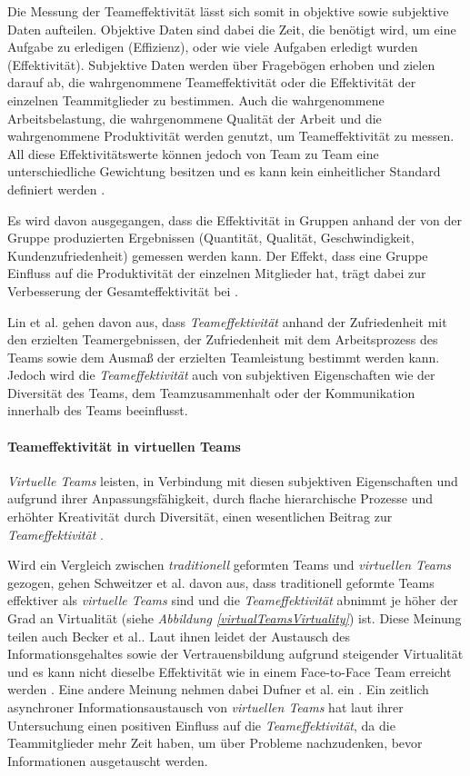 \documentclass[a4paper,11pt]{article}%
\renewcommand{\\}{\vspace*{0.5\baselineskip} \newline}
\begin{document}
Die Messung der Teameffektivität lässt sich somit in objektive sowie subjektive Daten aufteilen. Objektive Daten sind dabei die Zeit, die benötigt wird, um eine Aufgabe zu erledigen (Effizienz), oder wie viele Aufgaben erledigt wurden (Effektivität). Subjektive Daten werden über Fragebögen erhoben und zielen darauf ab, die wahrgenommene Teameffektivität oder die Effektivität der einzelnen Teammitglieder zu bestimmen. Auch die wahrgenommene Arbeitsbelastung, die wahrgenommene Qualität der Arbeit und die wahrgenommene Produktivität werden genutzt, um Teameffektivität zu messen. All diese Effektivitätswerte können jedoch von Team zu Team eine unterschiedliche Gewichtung besitzen und es kann kein einheitlicher Standard definiert werden \citep[9]{pina2008teams}. 

Es wird davon ausgegangen, dass die Effektivität in Gruppen anhand der von der Gruppe produzierten Ergebnissen (Quantität, Qualität, Geschwindigkeit, Kundenzufriedenheit) gemessen werden kann. Der Effekt, dass eine Gruppe Einfluss auf die Produktivität der einzelnen Mitglieder hat, trägt dabei zur Verbesserung der Gesamteffektivität bei \citep[S. 309]{guzzo1996teams}. 

Lin et al. \citep{lin2008model} gehen davon aus, dass \textit{Teameffektivität} anhand der Zufriedenheit mit den erzielten Teamergebnissen, der Zufriedenheit mit dem Arbeitsprozess des Teams sowie dem Ausmaß der erzielten Teamleistung bestimmt werden kann. Jedoch wird die \textit{Teameffektivität} auch von subjektiven Eigenschaften wie der Diversität des Teams, dem Teamzusammenhalt oder der Kommunikation innerhalb des Teams beeinflusst. 

\paragraph{Teameffektivität in virtuellen Teams}
\label{TEinVT}
\textit{Virtuelle Teams} leisten, in Verbindung mit diesen subjektiven Eigenschaften und aufgrund ihrer Anpassungsfähigkeit, durch flache hierarchische Prozesse und erhöhter Kreativität durch Diversität, einen wesentlichen Beitrag zur \textit{Teameffektivität} \citep{handke2019alles}.

Wird ein Vergleich zwischen \textit{traditionell} geformten Teams und \textit{virtuellen Teams} gezogen, gehen Schweitzer et al. \citep{schweitzer2010conceptualizing} davon aus, dass traditionell geformte Teams effektiver als \textit{virtuelle Teams} sind und die \textit{Teameffektivität} abnimmt je höher der Grad an Virtualität (siehe \textit{Abbildung \ref{virtualTeamsVirtuality}}) ist.
Diese Meinung teilen auch Becker et al.. Laut ihnen leidet der Austausch des Informationsgehaltes sowie der Vertrauensbildung aufgrund steigender Virtualität und es kann nicht dieselbe Effektivität wie in einem Face-to-Face Team erreicht werden \citep{becker2002fuhrung}.
Eine andere Meinung nehmen dabei Dufner et al. ein \citep{dufner2002asynchronous}. Ein zeitlich asynchroner Informationsaustausch von \textit{virtuellen Teams} hat laut ihrer Untersuchung einen positiven Einfluss auf die \textit{Teameffektivität}, da die Teammitglieder mehr Zeit haben, um über Probleme nachzudenken, bevor Informationen ausgetauscht werden.
\end{document}
